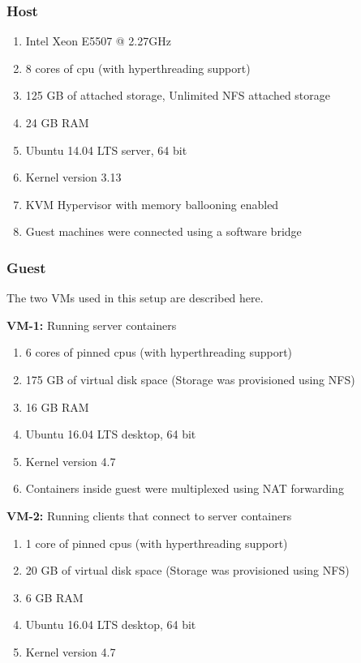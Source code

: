       \subsubsection{Host}
	
	\begin{enumerate}
	  \item Intel Xeon E5507 @ 2.27GHz
	  \item 8 cores of cpu (with hyperthreading support)
	  \item 125 GB of attached storage, Unlimited NFS attached storage 
	  \item 24 GB RAM
	  \item Ubuntu 14.04 LTS server, 64 bit 
	  \item Kernel version 3.13
	  \item KVM Hypervisor with memory ballooning enabled
	  \item Guest machines were connected using a software bridge
	\end{enumerate}
      
      \subsubsection{Guest}
	
	The two VMs used in this setup are described here.
	
	\noindent \textbf{VM-1:} Running server containers
	\begin{enumerate}
	  \item 6 cores of pinned cpus (with hyperthreading support)
	  \item 175 GB of virtual disk space (Storage was provisioned using NFS)
	  \item 16 GB RAM
	  \item Ubuntu 16.04 LTS desktop, 64 bit
	  \item Kernel version 4.7
	  \item Containers inside guest were multiplexed using NAT forwarding
	\end{enumerate}
	
	\noindent \textbf{VM-2:} Running clients that connect to server containers
	\begin{enumerate}
	  \item 1 core of pinned cpus (with hyperthreading support)
	  \item 20 GB of virtual disk space (Storage was provisioned using NFS)
	  \item 6 GB RAM
	  \item Ubuntu 16.04 LTS desktop, 64 bit
	  \item Kernel version 4.7
	\end{enumerate}
	
